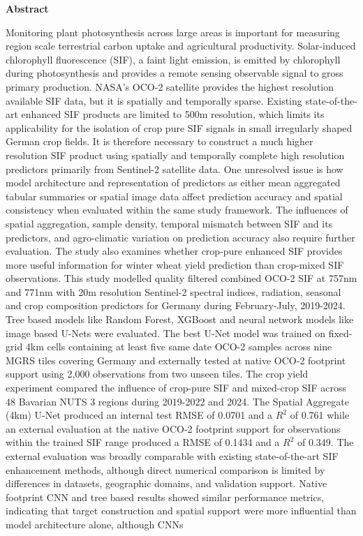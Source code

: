 \thispagestyle{empty}
\vspace*{1.0cm}

\begin{center}
    \textbf{Abstract}
\end{center}

\vspace*{0.5cm}

\noindent

Monitoring plant photosynthesis across large areas is important for measuring region scale terrestrial carbon uptake and agricultural productivity. Solar-induced chlorophyll fluorescence (SIF), a faint light emission, is emitted by chlorophyll during photosynthesis and provides a remote sensing observable signal to gross primary production. NASA's OCO-2 satellite provides the highest resolution available SIF data, but it is spatially and temporally sparse. Existing state-of-the-art enhanced SIF products are limited to 500m resolution, which limits its applicability for the isolation of crop pure SIF signals in small irregularly shaped German crop fields. It is therefore necessary to construct a much higher resolution SIF product using spatially and temporally complete high resolution predictors primarily from Sentinel-2 satellite data. One unresolved issue is how model architecture and representation of predictors as either mean aggregated tabular summaries or spatial image data affect prediction accuracy and spatial consistency when evaluated within the same study framework. The influences of spatial aggregation, sample density, temporal mismatch between SIF and its predictors, and agro-climatic variation on prediction accuracy also require further evaluation. The study also examines whether crop-pure enhanced SIF provides more useful information for winter wheat yield prediction than crop-mixed SIF observations. This study modelled quality filtered combined OCO-2 SIF at 757nm and 771nm with 20m resolution Sentinel-2 spectral indices, radiation, seasonal and crop composition predictors for Germany during February-July, 2019-2024. Tree based models like Random Forest, XGBoost and neural network models like image based U-Nets were evaluated. The best U-Net model was trained on fixed-grid 4km cells containing at least five same date OCO-2 samples across nine MGRS tiles covering Germany and externally tested at native OCO-2 footprint support using 2,000 observations from two unseen tiles. The crop yield experiment compared the influence of crop-pure SIF and mixed-crop SIF across 48 Bavarian NUTS 3 regions during 2019-2022 and 2024. The Spatial Aggregate (4km) U-Net produced an internal test RMSE of 0.0701 and a $R^2$ of 0.761 while an external evaluation at the native OCO-2 footprint support for observations within the trained SIF range produced a RMSE of 0.1434 and a $R^2$ of 0.349. The external evaluation was broadly comparable with existing state-of-the-art SIF enhancement methods, although direct numerical comparison is limited by differences in datasets, geographic domains, and validation support. Native footprint CNN and tree based results showed similar performance metrics, indicating that target construction and spatial support were more influential than model architecture alone, although CNNs 